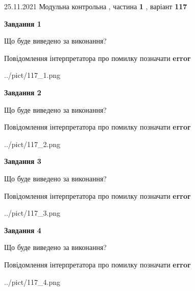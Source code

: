 \documentclass[10pt, ukrainian]{article}
\begin{document}
{25.11.2021 Модульна контрольна , частина \textbf { 1 }, варіант  \No \textbf { 117 }\par}
{
\begin {large}

{\begin {center}\textbf{Завдання 1}\end {center}}\par
Що буде виведено за виконання? \par
Повідомлення інтерпретатора про помилку позначати \textbf{error}

\begin{center}
	{../pict/117_1.png}
\end{center}
\newpage

{\begin {center}\textbf{Завдання 2}\end {center}}\par
Що буде виведено за виконання? \par
Повідомлення інтерпретатора про помилку позначати \textbf{error}

\begin{center}
	{../pict/117_2.png}
\end{center}
\newpage

{\begin {center}\textbf{Завдання 3}\end {center}}\par
Що буде виведено за виконання? \par
Повідомлення інтерпретатора про помилку позначати \textbf{error}

\begin{center}
	{../pict/117_3.png}
\end{center}
\newpage

{\begin {center}\textbf{Завдання 4}\end {center}}\par
Що буде виведено за виконання? \par
Повідомлення інтерпретатора про помилку позначати \textbf{error}

\begin{center}
	{../pict/117_4.png}
\end{center}
\newpage


\end{large}}
\end{document}
